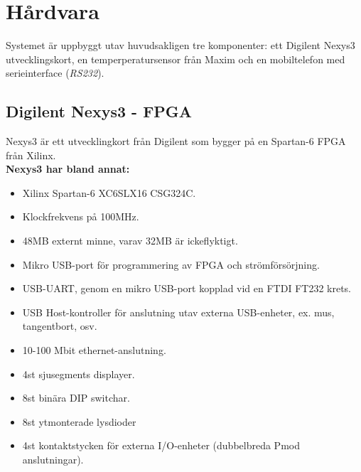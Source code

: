 \section{Hårdvara}\label{sec:hårdvara}
	Systemet är uppbyggt utav huvudsakligen tre komponenter: ett Digilent Nexys3 utvecklingskort, en
	temperperatursensor från Maxim och en mobiltelefon med serieinterface (\emph{RS232}).

	\subsection{Digilent Nexys3 - FPGA}
		Nexys3 är ett utvecklingkort från Digilent som bygger på en Spartan-6 FPGA från Xilinx.
		\\
		\textbf{Nexys3 har bland annat:}
		\begin{itemize}
			\item Xilinx Spartan-6 XC6SLX16 CSG324C.
			\item Klockfrekvens på 100MHz.
			\item 48MB externt minne, varav 32MB är ickeflyktigt.
			\item Mikro USB-port för programmering av FPGA och strömförsörjning.
			\item USB-UART, genom en mikro USB-port kopplad vid en FTDI FT232 krets.
			\item USB Host-kontroller för anslutning utav externa USB-enheter, ex. mus, tangentbort, osv.
			\item 10-100 Mbit ethernet-anslutning.
			\item 4st sjusegments displayer.
			\item 8st binära DIP switchar.
			\item 8st ytmonterade lysdioder
			\item 4st kontaktstycken för externa I/O-enheter (dubbelbreda Pmod anslutningar).
		\end{itemize}
		
		
		
		


